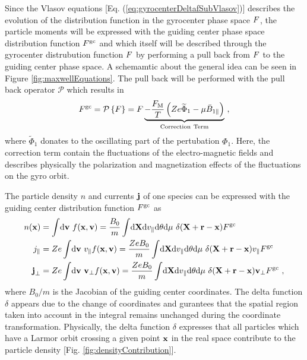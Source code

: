 Since the Vlasov equations [Eq. (\ref{eq:gyrocenterDeltafSubVlasov})] describes the evolution of the distribution function in the gyrocenter phase space $F$, the particle moments will be expressed with the guiding center phase space distribution function $F^\mathrm{gc}$ and which itself will be described through the gyrocenter distrubution function $F$ by performing a pull back from $F$ to the guiding center phase space. A schemamtic about the general idea can be seen in Figure \ref{fig:maxwellEquations}. The pull back will be performed with the pull back operator $\mathcal{P}$ which results in
\begin{gather}
	F^\mathrm{gc} = \mathcal{P} \left\{ F \right\} = F \underbrace{- \frac{F_\mathrm{M}}{T}\left(Ze \widetilde{\Phi}_1 - \mu \bar{B}_{1\parallel}\right)}_{\mathrm{Correction~Term}}~,
	\label{eq:pullback}
\end{gather}
where $\widetilde{\Phi}_1$ donates to the oscillating part of the pertubation $\Phi_1$. Here, the correction term contain the fluctuations of the electro-magnetic fields and describes physically the polarization and magnetization effects of the fluctuations on the gyro orbit. \cite{Brizard2007}
 

The particle density $n$ and currents $\boldsymbol{\mathbf{j}}$ of one species can be expressed with the guiding center distribution function $F^\mathrm{gc}$ as
\begin{gather}
	\begin{aligned}
		n(\boldsymbol{\mathbf{x}}) &= \int \! \mathrm{d}\boldsymbol{\mathbf{v}} ~ f(\boldsymbol{\mathbf{x}}, \boldsymbol{\mathbf{v}}) = \frac{B_0}{m} \int \! \mathrm{d}\boldsymbol{\mathbf{X}}\mathrm{d}v_\parallel\mathrm{d}\theta\mathrm{d}\mu ~ \delta(\boldsymbol{\mathbf{X}} + \boldsymbol{\mathbf{r}} - \boldsymbol{\mathbf{x}}) F^\mathrm{gc} \\
		j_\parallel &= Ze \int \! \mathrm{d}\boldsymbol{\mathbf{v}} ~ v_\parallel f(\boldsymbol{\mathbf{x}}, \boldsymbol{\mathbf{v}})= \frac{Ze B_0}{m} \int \! \mathrm{d}\boldsymbol{\mathbf{X}}\mathrm{d}v_\parallel\mathrm{d}\theta\mathrm{d}\mu ~ \delta(\boldsymbol{\mathbf{X}} + \boldsymbol{\mathbf{r}} - \boldsymbol{\mathbf{x}}) v_\parallel F^\mathrm{gc} \\
		\boldsymbol{\mathbf{j}}_\perp &= Ze \int \! \mathrm{d}\boldsymbol{\mathbf{v}} ~ \boldsymbol{\mathbf{v}}_\perp f(\boldsymbol{\mathbf{x}}, \boldsymbol{\mathbf{v}}) = \frac{Ze B_0}{m} \int \! \mathrm{d}\boldsymbol{\mathbf{X}}\mathrm{d}v_\parallel\mathrm{d}\theta\mathrm{d}\mu ~ \delta(\boldsymbol{\mathbf{X}} + \boldsymbol{\mathbf{r}} - \boldsymbol{\mathbf{x}}) \boldsymbol{\mathbf{v}}_\perp F^\mathrm{gc} ~,
	\end{aligned}
	\label{eq:momentsGuidingCenter}
\end{gather}
where $B_0/m$ is the Jacobian of the guiding center coordinates. The delta function $\delta$ appears due to the change of coordinates and gurantees that the spatial region taken into account in the integral remains unchanged during the coordinate transformation. Physically, the delta function $\delta$ expresses that all particles which have a Larmor orbit crossing a given point $\boldsymbol{\mathbf{x}}$ in the real space contribute to the particle density [Fig. \ref{fig:densityContribution}]. 


